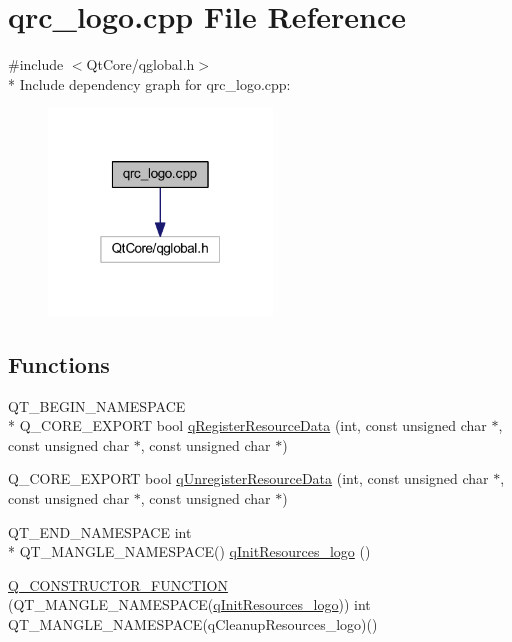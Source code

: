\hypertarget{a00126}{\section{qrc\+\_\+logo.\+cpp File Reference}
\label{a00126}
}
{\ttfamily \#include $<$Qt\+Core/qglobal.\+h$>$}\\*
Include dependency graph for qrc\+\_\+logo.\+cpp\+:
\nopagebreak
\begin{figure}[H]
\begin{center}
\leavevmode
\includegraphics[width=169pt]{dd/d1d/a00336}
\end{center}
\end{figure}
\subsection*{Functions}
\begin{DoxyCompactItemize}
\item 
Q\+T\+\_\+\+B\+E\+G\+I\+N\+\_\+\+N\+A\+M\+E\+S\+P\+A\+C\+E \\*
Q\+\_\+\+C\+O\+R\+E\+\_\+\+E\+X\+P\+O\+R\+T bool \hyperlink{a00126_ab3bec3d1e679084be46edc41e4c91bc1}{q\+Register\+Resource\+Data} (int, const unsigned char $\ast$, const unsigned char $\ast$, const unsigned char $\ast$)
\item 
Q\+\_\+\+C\+O\+R\+E\+\_\+\+E\+X\+P\+O\+R\+T bool \hyperlink{a00126_ad65f8bca8010dd1fd135a28a085c6d03}{q\+Unregister\+Resource\+Data} (int, const unsigned char $\ast$, const unsigned char $\ast$, const unsigned char $\ast$)
\item 
Q\+T\+\_\+\+E\+N\+D\+\_\+\+N\+A\+M\+E\+S\+P\+A\+C\+E int \\*
Q\+T\+\_\+\+M\+A\+N\+G\+L\+E\+\_\+\+N\+A\+M\+E\+S\+P\+A\+C\+E() \hyperlink{a00126_a26f25d34489dcef5b740853d8506af1c}{q\+Init\+Resources\+\_\+logo} ()
\item 
\hyperlink{a00126_ae1f71e8cee42447be2c10a353b147b74}{Q\+\_\+\+C\+O\+N\+S\+T\+R\+U\+C\+T\+O\+R\+\_\+\+F\+U\+N\+C\+T\+I\+O\+N} (Q\+T\+\_\+\+M\+A\+N\+G\+L\+E\+\_\+\+N\+A\+M\+E\+S\+P\+A\+C\+E(\hyperlink{a00126_a26f25d34489dcef5b740853d8506af1c}{q\+Init\+Resources\+\_\+logo})) int Q\+T\+\_\+\+M\+A\+N\+G\+L\+E\+\_\+\+N\+A\+M\+E\+S\+P\+A\+C\+E(q\+Cleanup\+Resources\+\_\+logo)()
\end{DoxyCompactItemize}


